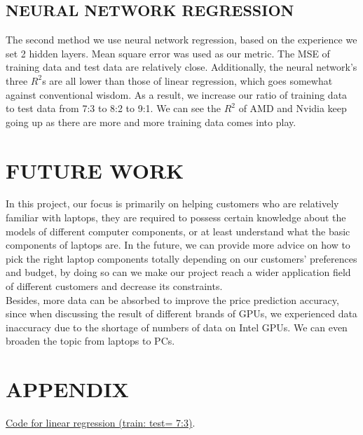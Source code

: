 \documentclass{scrartcl}
\begin{document}
\subsection{NEURAL NETWORK REGRESSION}
The second method we use neural network regression, based on the experience we set 2 hidden layers. Mean square error was used as our metric. The MSE of training data and test data are relatively close. Additionally, the neural network's three $R^2$s are all lower than those of linear regression, which goes somewhat against conventional wisdom. As a result, we increase our ratio of training data to test data from 7:3 to 8:2 to 9:1. We can see the $R^2$ of AMD and Nvidia keep going up as there are more and more training data comes into play.\\






\section{FUTURE WORK}

In this project, our focus is primarily on helping customers who are relatively familiar with laptops, they are required to possess certain knowledge about the models of different computer components, or at least understand what the basic components of laptops are. In the future, we can provide more advice on how to pick the right laptop components totally depending on our customers' preferences and budget, by doing so can we make our project reach a wider application field of different customers and decrease its constraints.\\
Besides, more data can be absorbed to improve the price prediction accuracy, since when discussing the result of different brands of GPUs, we experienced data inaccuracy due to the shortage of numbers of data on Intel GPUs. We can even broaden the topic from laptops to PCs.\\


\newpage
\singlespacing




\newpage
\appendix
\section{APPENDIX}

\href{https://github.com/zw2788/MECE4520\_project/blob/main/MECE\_4520\_LaptopPrediction/Method\_Linear.ipynb}{Code for linear regression (train: test= 7:3)}.\\
\end{document}
